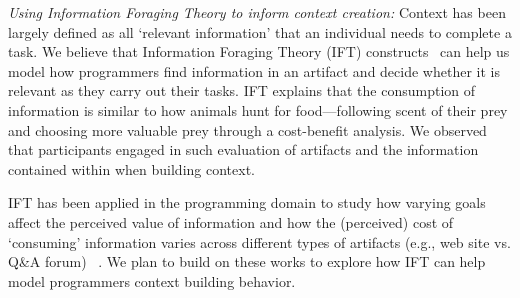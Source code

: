 
\textit{Using Information Foraging Theory to inform context creation:}
Context has been largely defined as all `relevant information' that an individual needs to complete a task. We believe that Information Foraging Theory (IFT) constructs~\cite{Pirolli:1995,Fleming:2013} can help us model how programmers find information in an artifact and decide whether it is relevant as they carry out their tasks. IFT explains that the consumption of information is similar to how animals hunt for food---following scent of their prey and choosing more valuable prey through a cost-benefit analysis. We observed that participants engaged in such evaluation of artifacts and the information contained within when building context. 


IFT has been applied in the programming domain to study how varying goals~\cite{Piorkowski:2015} affect the perceived value of information and how the (perceived) cost of `consuming' information varies across different types of artifacts (e.g., web site vs. Q\&A forum) ~\cite{Jin:2017}. We plan to build on these works to explore how IFT can help model programmers context building behavior. 




